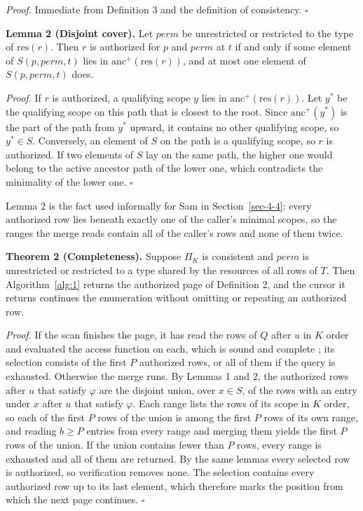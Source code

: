 \documentclass[conference]{IEEEtran}
\begin{document}
\emph{Proof.} Immediate from Definition 3 and the definition of consistency. \(\square\)

\textbf{Lemma 2 (Disjoint cover).} Let \(\mathit{perm}\) be unrestricted or restricted to the type of \(\mathrm{res}(r)\). Then \(r\) is authorized for \(p\) and \(\mathit{perm}\) at \(t\) if and only if some element of \(S(p, \mathit{perm}, t)\) lies in \(\mathrm{anc}^{+}(\mathrm{res}(r))\), and at most one element of \(S(p, \mathit{perm}, t)\) does.

\emph{Proof.} If \(r\) is authorized, a qualifying scope \(y\) lies in \(\mathrm{anc}^{+}(\mathrm{res}(r))\). Let \(y^{*}\) be the qualifying scope on this path that is closest to the root. Since \(\mathrm{anc}^{+}(y^{*})\) is the part of the path from \(y^{*}\) upward, it contains no other qualifying scope, so \(y^{*} \in S\). Conversely, an element of \(S\) on the path is a qualifying scope, so \(r\) is authorized. If two elements of \(S\) lay on the same path, the higher one would belong to the active ancestor path of the lower one, which contradicts the minimality of the lower one. \(\square\)

Lemma 2 is the fact used informally for Sam in Section~\ref{sec-4-4}: every authorized row lies beneath exactly one of the caller's minimal scopes, so the ranges the merge reads contain all of the caller's rows and none of them twice.

\textbf{Theorem 2 (Completeness).} Suppose \(\Pi_K\) is consistent and \(\mathit{perm}\) is unrestricted or restricted to a type shared by the resources of all rows of \(T\). Then Algorithm~\ref{alg:1} returns the authorized page of Definition 2, and the cursor it returns continues the enumeration without omitting or repeating an authorized row.

\emph{Proof.} If the scan finishes the page, it has read the rows of \(Q\) after \(u\) in \(K\) order and evaluated the access function on each, which is sound and complete \cite{ref8}; its selection consists of the first \(P\) authorized rows, or all of them if the query is exhausted. Otherwise the merge runs. By Lemmas 1 and 2, the authorized rows after \(u\) that satisfy \(\varphi\) are the disjoint union, over \(x \in S\), of the rows with an entry under \(x\) after \(u\) that satisfy \(\varphi\). Each range lists the rows of its scope in \(K\) order, so each of the first \(P\) rows of the union is among the first \(P\) rows of its own range, and reading \(b \ge P\) entries from every range and merging them yields the first \(P\) rows of the union. If the union contains fewer than \(P\) rows, every range is exhausted and all of them are returned. By the same lemmas every selected row is authorized, so verification removes none. The selection contains every authorized row up to its last element, which therefore marks the position from which the next page continues. \(\square\)
\end{document}
